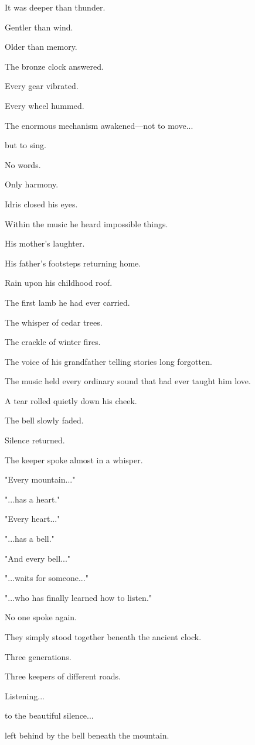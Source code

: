 \documentclass[12pt,openany]{book}
\begin{document}
It was deeper than thunder.

Gentler than wind.

Older than memory.

The bronze clock answered.

Every gear vibrated.

Every wheel hummed.

The enormous mechanism awakened—not to move...

but to sing.

No words.

Only harmony.

Idris closed his eyes.

Within the music he heard impossible things.

His mother's laughter.

His father's footsteps returning home.

Rain upon his childhood roof.

The first lamb he had ever carried.

The whisper of cedar trees.

The crackle of winter fires.

The voice of his grandfather telling stories long forgotten.

The music held every ordinary sound that had ever taught him love.

A tear rolled quietly down his cheek.

The bell slowly faded.

Silence returned.

The keeper spoke almost in a whisper.

"Every mountain..."

"...has a heart."

"Every heart..."

"...has a bell."

"And every bell..."

"...waits for someone..."

"...who has finally learned how to listen."

No one spoke again.

They simply stood together beneath the ancient clock.

Three generations.

Three keepers of different roads.

Listening...

to the beautiful silence...

left behind by the bell beneath the mountain.
\end{document}
